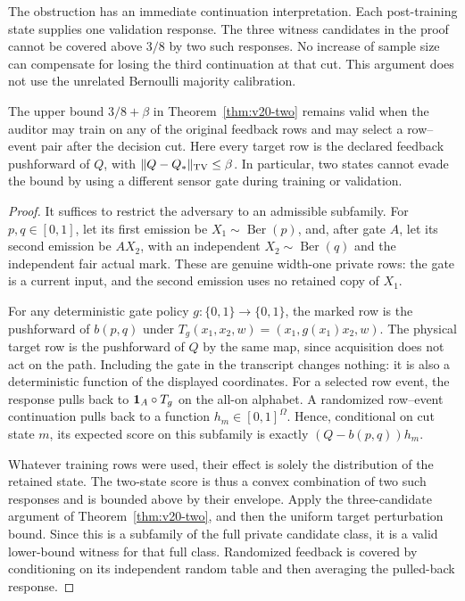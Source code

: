 The obstruction has an immediate continuation interpretation. Each
post-training state supplies one validation response. The three witness
candidates in the proof cannot be covered above $3/8$ by two such
responses. No increase of sample size can compensate for losing the
third continuation at that cut. This argument does not use the unrelated
Bernoulli majority calibration.


\begin{lemma}
\label{lem:v20-feedback}
The upper bound $3/8+\beta$ in Theorem~\ref{thm:v20-two} remains valid
when the auditor may train on any of the original feedback rows and may
select a row--event pair after the decision cut. Here every target row is
the declared feedback pushforward of $Q$, with
$\|Q-Q_*\|_{\rm TV}\le\beta$. In particular, two states cannot evade
the bound by using a different sensor gate during training or validation.
\end{lemma}
\begin{proof}
It suffices to restrict the adversary to an admissible subfamily. For
$p,q\in[0,1]$, let its first emission be $X_1\sim\operatorname{Ber}(p)$,
and, after gate $A$, let its second emission be $AX_2$, with an independent
$X_2\sim\operatorname{Ber}(q)$ and the independent fair actual mark.
These are genuine width-one private rows: the gate is a current input,
and the second emission uses no retained copy of $X_1$.

For any deterministic gate policy $g:\{0,1\}\to\{0,1\}$, the marked
row is the pushforward of $b(p,q)$ under
$T_g(x_1,x_2,w)=(x_1,g(x_1)x_2,w)$. The physical target row is the
pushforward of $Q$ by the same map, since acquisition does not act on the
path. Including the gate in the transcript changes nothing: it is also
a deterministic function of the displayed coordinates. For a selected
row event, the response pulls back to $\mathbf 1_A\circ T_g$ on the all-on
alphabet. A randomized row--event continuation pulls back to a function
$h_m\in[0,1]^\Omega$. Hence, conditional on cut state $m$, its expected
score on this subfamily is exactly $(Q-b(p,q))h_m$.

Whatever training rows were used, their effect is solely the distribution
of the retained state. The two-state score is thus a convex combination
of two such responses and is bounded above by their envelope. Apply the
three-candidate argument of Theorem~\ref{thm:v20-two}, and then the
uniform target perturbation bound. Since this is a subfamily of the full
private candidate class, it is a valid lower-bound witness for that full
class. Randomized feedback is covered by conditioning on its independent
random table and then averaging the pulled-back response.
\end{proof}

